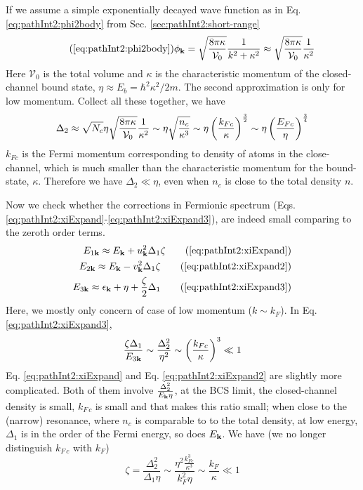 If we assume a simple exponentially decayed wave function as in Eq. \ref{eq:pathInt2:phi2body} from Sec. \ref{sec:pathInt2:short-range} 
\begin{equation}\tag{\ref{eq:pathInt2:phi2body}}
\phi_{\vk}=\sqrt{\frac{8\pi\kappa}{\mathcal{V}_{0}}}\frac{1}{k^{2}+\kappa^{2}}\approx\sqrt{\frac{8\pi\kappa}{\mathcal{V}_{0}}}\frac{1}{\kappa^{2}}
\end{equation}
Here  $\mathcal{V}_{0}$ is the total volume and $\kappa$ is the characteristic momentum of the closed-channel bound state, $\eta\approx{}E_{b}=\hbar^{2}\kappa^{2}/2m$.  The second approximation is only for  low momentum.  Collect all these together, we have
\begin{equation}
\Delta_{2}\approx\sqrt{N_{c}}\eta\sqrt{\frac{8\pi\kappa}{\mathcal{V}_{0}}}\frac{1}{\kappa^{2}}
\sim\eta\sqrt\frac{n_{c}}{\kappa^{3}}
\sim\eta\left(\frac{k_{Fc}}{\kappa}\right)^{\frac{3}{2}}
\sim\eta\left(\frac{E_{Fc}}{\eta}\right)^{\frac{3}{4}}
\end{equation}
$k_{Fc}$ is the Fermi momentum corresponding to density of atoms in the close-channel, which is much smaller than the characteristic momentum for the bound-state, $\kappa$.   Therefore we have $\Delta_{2}\ll\eta$, even when $n_{c}$ is close to the total density $n$. 

Now we check whether the corrections in Fermionic spectrum (Eqs. \ref{eq:pathInt2:xiExpand}-\ref{eq:pathInt2:xiExpand3}), 
are indeed small comparing to the zeroth order terms.  
\begin{align}
E_{1\vk}\approx{}E_{\vk}+u_{\vk}^{2}\Delta_{1}\zeta\tag{\ref{eq:pathInt2:xiExpand}}\\
E_{2\vk}\approx{}E_{\vk}-v_{\vk}^{2}\Delta_{1}\zeta\tag{\ref{eq:pathInt2:xiExpand2}}\\
E_{3\vk}\approx{}\epsilon_{\vk}+\eta+\frac{\zeta}{2}\Delta_{1}
\tag{\ref{eq:pathInt2:xiExpand3}}
\end{align}
Here, we mostly only concern of case of low momentum ($k\sim{}k_{F}$).  In Eq. \ref{eq:pathInt2:xiExpand3}, 
\begin{equation*}
\frac{\zeta\Delta_{1}}{E_{3\mathbf{k}}}\sim{}\frac{\Delta_{2}^{2}}{\eta^{2}}\sim\left(\frac{k_{Fc}}{\kappa}\right)^{3}\ll1
\end{equation*}
Eq. \ref{eq:pathInt2:xiExpand} and Eq. \ref{eq:pathInt2:xiExpand2} are slightly more complicated.  Both of them involve $\frac{\Delta_{2}^{2}}{E_{\mathbf{k}}\eta}$,  at the  BCS limit, the closed-channel density is small, $k_{F\,c}$ is small and that makes this ratio small; when close to the (narrow) resonance, where $n_{c}$ is comparable to to the total density, at low energy, $\Delta_{1}$ is in the order of the Fermi energy, so does $E_{\mathbf{k}}$.   We have (we no longer distinguish $k_{F\,c}$ with $k_{F}$)
 \begin{equation}\label{eq:pathApp:zetaEs}
 \zeta=\frac{\Delta_{2}^{2}}{\Delta_{1}\eta}\sim\frac{\eta^{2}\frac{k_{Fc}^{3}}{\kappa^{3}}}{k_{F}^{2}\eta}\sim\frac{k_{F}}{\kappa}\ll1
\end{equation}

